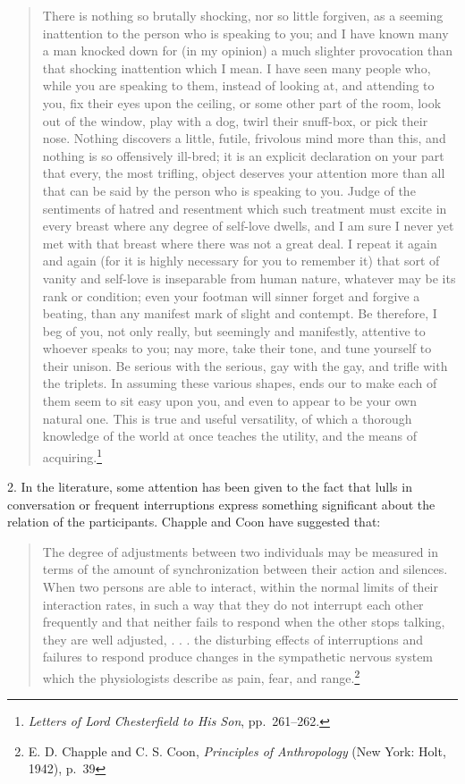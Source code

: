 \documentclass[twoside,symmetric,nobib,justified]{tufte-book}
\begin{document}
\vspace{0.125in}

\begin{quote}
There is nothing so brutally shocking, nor so little forgiven, as a
seeming inattention to the person who is speaking to you; and I have
known many a man knocked down for (in my opinion) a much slighter
provocation than that shocking inattention which I mean. I have seen
many people who, while you are speaking to them, instead of looking at,
and attending to you, fix their eyes upon the ceiling, or some other
part of the room, look out of the window, play with a dog, twirl their
snuff-box, or pick their nose. Nothing discovers a little, futile,
frivolous mind more than this, and nothing is so offensively ill-bred;
it is an explicit declaration on your part that every, the most
trifling, object deserves your attention more than all that can be said
by the person who is speaking to you. Judge of the sentiments of hatred
and resentment which such treatment must excite in every breast where
any degree of self-love dwells, and I am sure I never yet met with that
breast where there was not a great deal. I repeat it again and again
(for it is highly necessary for you to remember it) that sort of vanity
and self-love is inseparable from human nature, whatever may be its rank
or condition; even your footman will sinner forget and forgive a
beating, than any manifest mark of slight and contempt. Be therefore, I
beg of you, not only really, but seemingly and manifestly, attentive to
whoever speaks to you; nay more, take their tone, and tune yourself to
their unison. Be serious with the serious, gay with the gay, and trifle
with the triplets. In assuming these various shapes, ends our to make
each of them seem to sit easy upon you, and even to appear to be your
own natural one. This is true and useful versatility, of which a
thorough knowledge of the world at once teaches the utility, and the
means of acquiring.\footnote{\emph{Letters of Lord Chesterfield to His
  Son}, pp.~261--262.}
\end{quote}

2. In the literature, some attention has been given to the
fact that lulls in conversation or frequent interruptions express
something significant about the relation of the participants. Chapple
and Coon have suggested that:

\begin{quote}
The degree of adjustments between two individuals may be measured in
terms of the amount of synchronization between their action and
silences. When two persons are able to interact, within the normal
limits of their interaction rates, in such a way that they do not
interrupt each other frequently and that neither fails to respond when
the other stops talking, they are well adjusted, . . . the disturbing
effects of interruptions and failures to respond produce changes in the
sympathetic nervous system which the physiologists describe as pain,
fear, and range.\footnote{E. D. Chapple and C. S. Coon, \emph{Principles
  of Anthropology} (New York: Holt, 1942), p.~39}
\end{quote}
\end{document}
